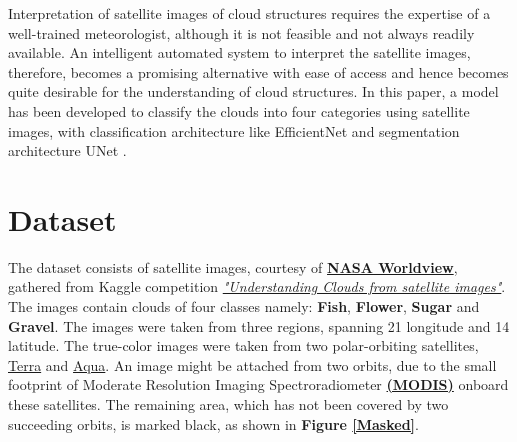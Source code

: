 \documentclass[conference]{IEEEtran}
\begin{document}
Interpretation of satellite images of cloud structures requires the expertise of a well-trained meteorologist, although it is not feasible and not always readily available. An intelligent automated system to interpret the satellite images, therefore, becomes a promising alternative with ease of access and hence becomes quite desirable for the understanding of cloud structures. In this paper, a model has been developed to classify the clouds into four categories using satellite images, with classification architecture like EfficientNet and segmentation architecture UNet \cite{tan2019efficientnet} \cite{ronneberger2015u}.












\section{Dataset \label{dataset}}

The dataset consists of satellite images, courtesy of \href{https://worldview.earthdata.nasa.gov/}{ \textbf{NASA Worldview}}, gathered from Kaggle competition \color{blue}\href{ https://www.kaggle.com/c/understanding_cloud_organization/data}{\textit{"Understanding Clouds from satellite images"}}\color{black}. The images contain clouds of four classes namely: \textbf{Fish}, \textbf{Flower}, \textbf{Sugar} and \textbf{Gravel}. The images were taken from three regions, spanning 21 longitude and 14 latitude. The true-color images were taken from two polar-orbiting satellites, \href{https://en.wikipedia.org/wiki/Terra_(satellite)}{Terra} and \href{https://en.wikipedia.org/wiki/Aqua_(satellite)}{Aqua}. An image might be attached from two orbits, due to the small footprint of Moderate Resolution Imaging Spectroradiometer \href{https://modis.gsfc.nasa.gov/}{\textbf{(MODIS)}} onboard these satellites. The remaining area, which has not been covered by two succeeding orbits, is marked black, as shown in \textbf{Figure \ref{Masked}}.
\end{document}

